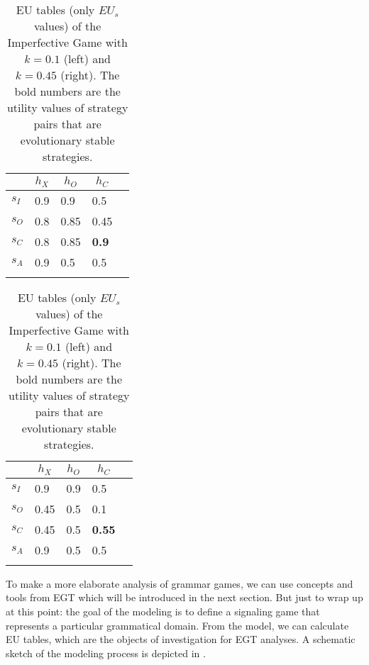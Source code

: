 \documentclass[output=paper,hidelinks]{langscibook}
\begin{document}
\begin{table}
\begin{subtable}{.5\textwidth}\centering
\caption{$k=0.1$}
\begin{tabular}{lllll} 
\lsptoprule
 & \multicolumn{1}{c}{$h_X$} & \multicolumn{1}{c}{$h_O$} & \multicolumn{1}{c}{$h_C$}  \\\midrule
$s_I$   & 0.9  &  0.9  & 0.5   \\
$s_O$ & 0.8  &  0.85  & 0.45   \\
$s_C$ & 0.8  &  0.85  & \textbf{0.9}   \\
$s_A$ & 0.9  &  0.5  & 0.5   \\\lspbottomrule
\end{tabular}
\end{subtable}\begin{subtable}{.5\textwidth}\centering
\caption{$k=0.45$}
\begin{tabular}{lllll}
\lsptoprule
 & \multicolumn{1}{c}{$h_X$} & \multicolumn{1}{c}{$h_O$} & \multicolumn{1}{c}{$h_C$}  \\\midrule
$s_I$   & 0.9  &  0.9  & 0.5   \\
$s_O$ & 0.45  &  0.5  & 0.1   \\
$s_C$ & 0.45  &  0.5  & \textbf{0.55}   \\
$s_A$ & 0.9  &  0.5  & 0.5   \\
\lspbottomrule
\end{tabular}
\end{subtable}
\caption{EU tables (only $EU_s$ values) of the Imperfective Game with $k=0.1$ (left) and $k=0.45$ (right). The bold numbers are the utility values of strategy pairs that are evolutionary stable strategies.\label{EU_Imp}}
\end{table}

To make a more elaborate analysis of grammar games, we can use concepts and tools from EGT which will be introduced in the next section. But just to wrap up at this point: the goal of the modeling is to define a signaling game that represents a particular grammatical domain. From the model, we can calculate EU tables, 
which are the objects of investigation for EGT analyses. 
A schematic sketch of the modeling process is depicted in .
\end{document}
